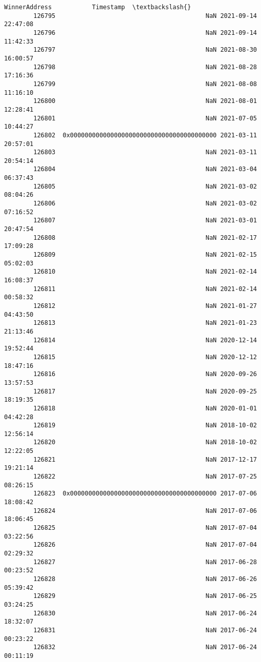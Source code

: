 \documentclass[11pt]{article}
\begin{document}
\begin{Verbatim}[commandchars=\\\{\}]
                                             WinnerAddress           Timestamp  \textbackslash{}
        126795                                         NaN 2021-09-14 22:47:08   
        126796                                         NaN 2021-09-14 11:42:33   
        126797                                         NaN 2021-08-30 16:00:57   
        126798                                         NaN 2021-08-28 17:16:36   
        126799                                         NaN 2021-08-08 11:16:10   
        126800                                         NaN 2021-08-01 12:28:41   
        126801                                         NaN 2021-07-05 10:44:27   
        126802  0x0000000000000000000000000000000000000000 2021-03-11 20:57:01   
        126803                                         NaN 2021-03-11 20:54:14   
        126804                                         NaN 2021-03-04 06:37:43   
        126805                                         NaN 2021-03-02 08:04:26   
        126806                                         NaN 2021-03-02 07:16:52   
        126807                                         NaN 2021-03-01 20:47:54   
        126808                                         NaN 2021-02-17 17:09:28   
        126809                                         NaN 2021-02-15 05:02:03   
        126810                                         NaN 2021-02-14 16:08:37   
        126811                                         NaN 2021-02-14 00:58:32   
        126812                                         NaN 2021-01-27 04:43:50   
        126813                                         NaN 2021-01-23 21:13:46   
        126814                                         NaN 2020-12-14 19:52:44   
        126815                                         NaN 2020-12-12 18:47:16   
        126816                                         NaN 2020-09-26 13:57:53   
        126817                                         NaN 2020-09-25 18:19:35   
        126818                                         NaN 2020-01-01 04:42:28   
        126819                                         NaN 2018-10-02 12:56:14   
        126820                                         NaN 2018-10-02 12:22:05   
        126821                                         NaN 2017-12-17 19:21:14   
        126822                                         NaN 2017-07-25 08:26:15   
        126823  0x0000000000000000000000000000000000000000 2017-07-06 18:08:42   
        126824                                         NaN 2017-07-06 18:06:45   
        126825                                         NaN 2017-07-04 03:22:56   
        126826                                         NaN 2017-07-04 02:29:32   
        126827                                         NaN 2017-06-28 00:23:52   
        126828                                         NaN 2017-06-26 05:39:42   
        126829                                         NaN 2017-06-25 03:24:25   
        126830                                         NaN 2017-06-24 18:32:07   
        126831                                         NaN 2017-06-24 00:23:22   
        126832                                         NaN 2017-06-24 00:11:19   
        

\end{Verbatim}
\end{document}
